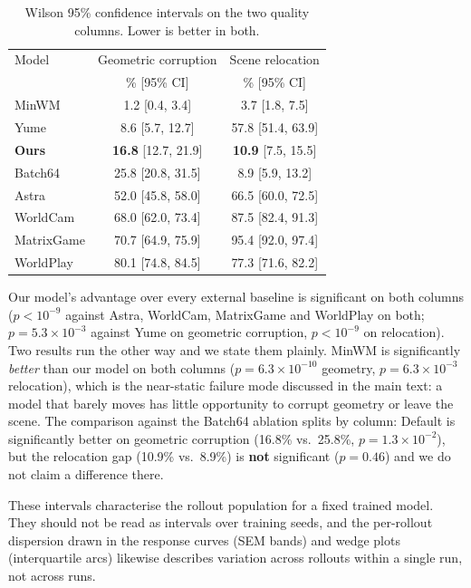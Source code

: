 \documentclass[letterpaper]{article} %
\begin{document}
\begin{table}[t]
\centering
\small
\begin{tabular}{lcc}
\toprule
Model & Geometric corruption & Scene relocation \\
      & \% [95\% CI]         & \% [95\% CI] \\
\midrule
MinWM      & \phantom{0}1.2 [0.4, 3.4]    & \phantom{0}3.7 [1.8, 7.5] \\
Yume       & \phantom{0}8.6 [5.7, 12.7]   & 57.8 [51.4, 63.9] \\
\textbf{Ours} & \textbf{16.8} [12.7, 21.9] & \textbf{10.9} [7.5, 15.5] \\
Batch64    & 25.8 [20.8, 31.5]            & \phantom{0}8.9 [5.9, 13.2] \\
Astra      & 52.0 [45.8, 58.0]            & 66.5 [60.0, 72.5] \\
WorldCam   & 68.0 [62.0, 73.4]            & 87.5 [82.4, 91.3] \\
MatrixGame & 70.7 [64.9, 75.9]            & 95.4 [92.0, 97.4] \\
WorldPlay  & 80.1 [74.8, 84.5]            & 77.3 [71.6, 82.2] \\
\bottomrule
\end{tabular}
\caption{Wilson 95\% confidence intervals on the two quality columns. Lower is
better in both.}
\label{tab:signif}
\end{table}

Our model's advantage over every external baseline is significant on both
columns ($p < 10^{-9}$ against Astra, WorldCam, MatrixGame and WorldPlay on
both; $p = 5.3\times10^{-3}$ against Yume on geometric corruption, $p < 10^{-9}$
on relocation). Two results run the other way and we state them plainly. MinWM
is significantly \emph{better} than our model on both columns
($p = 6.3\times10^{-10}$ geometry, $p = 6.3\times10^{-3}$ relocation), which is
the near-static failure mode discussed in the main text: a model that barely
moves has little opportunity to corrupt geometry or leave the scene. The
comparison against the Batch64 ablation splits by column: Default is
significantly better on geometric corruption (16.8\% vs.\ 25.8\%,
$p = 1.3\times10^{-2}$), but the relocation gap (10.9\% vs.\ 8.9\%) is
\textbf{not} significant ($p = 0.46$) and we do not claim a difference there.

These intervals characterise the rollout population for a fixed trained model.
They should not be read as intervals over training seeds, and the per-rollout
dispersion drawn in the response curves (SEM bands) and wedge plots
(interquartile arcs) likewise describes variation across rollouts within a
single run, not across runs.
\end{document}
